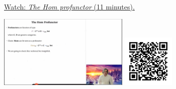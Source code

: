 
\begin{minipage}{10cm}
    \href{https://act4e-spring21.netlify.app/videos/spring2021-profunctors:hom-prof.html}{Watch: \emph{The Hom profunctor} (11 minutes).}
        
    \href{https://act4e-spring21.netlify.app/videos/spring2021-profunctors:hom-prof.html}{\includegraphics[height=3.5cm]{spring2021-profunctors:hom-prof/thumbnails.jpg}}
    \href{https://act4e-spring21.netlify.app/videos/spring2021-profunctors:hom-prof.html}{\includegraphics[height=2.5cm]{spring2021-profunctors:hom-prof/qrcode.png}}
\end{minipage}
